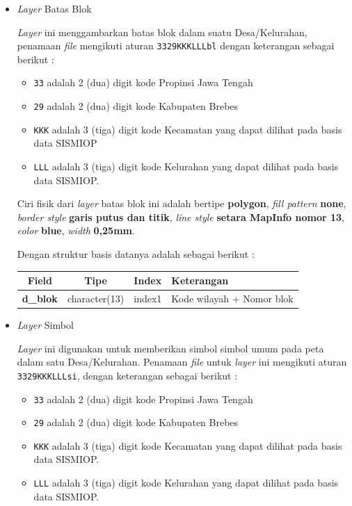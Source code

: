\begin{itemize}
  \item \textit{Layer} Batas Blok
  
  \textit{Layer} ini menggambarkan batas blok dalam suatu Desa/Kelurahan, penamaan \textit{file} mengikuti aturan \texttt{3329KKKLLLbl} dengan keterangan sebagai berikut :
  
  \begin{itemize}
    \item \texttt{33} adalah 2 (dua) digit kode Propinsi Jawa Tengah
    \item \texttt{29} adalah 2 (dua) digit kode Kabupaten Brebes
    \item \texttt{KKK} adalah 3 (tiga) digit kode Kecamatan yang dapat dilihat pada basis data SISMIOP
    \item \texttt{LLL} adalah 3 (tiga) digit kode Kelurahan yang dapat dilihat pada basis data SISMIOP.
  \end{itemize}
  
  Ciri fisik dari \textit{layer} batas blok ini adalah bertipe \textbf{polygon}, \textit{fill pattern} \textbf{none}, \textit{border style} \textbf{garis putus dan titik}, \textit{line style} \textbf{setara MapInfo nomor 13}, \textit{color} \textbf{blue}, \textit{width} \textbf{0,25mm}.
  
  Dengan struktur basis datanya adalah sebagai berikut :
  
  \begin{table}[H]
    \centering
    \begin{tabular}{| c | c | c | p{7cm} |}
      \hline
      Field & Tipe & Index & Keterangan \\
      \hline\hline
      \textbf{d\_blok} & character(13) & index1 & Kode wilayah + Nomor blok \\
      \hline
    \end{tabular}
  \end{table}
  
  \item \textit{Layer} Simbol
  
  \textit{Layer} ini digunakan untuk memberikan simbol simbol umum pada peta dalam satu Desa/Kelurahan. Penamaan \textit{file} untuk \textit{layer} ini mengikuti aturan \texttt{3329KKKLLLsi}, dengan keterangan sebagai berikut :
  
  \begin{itemize}
    \item \texttt{33} adalah 2 (dua) digit kode Propinsi Jawa Tengah
    \item \texttt{29} adalah 2 (dua) digit kode Kabupaten Brebes
    \item \texttt{KKK} adalah 3 (tiga) digit kode Kecamatan yang dapat dilihat pada basis data SISMIOP.
    \item \texttt{LLL} adalah 3 (tiga) digit kode Kelurahan yang dapat dilihat pada basis data SISMIOP.
  \end{itemize}
  

\end{itemize}
